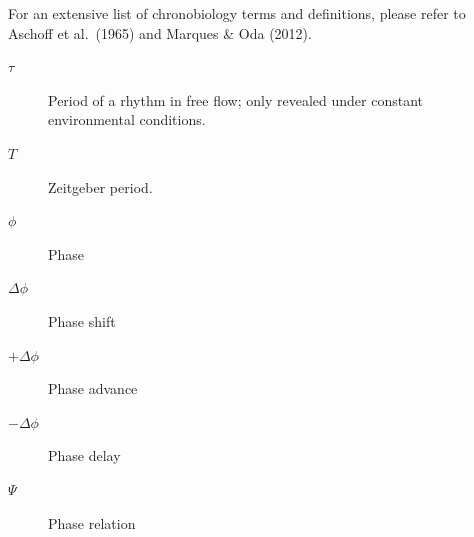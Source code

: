 \documentclass[
  12pt,
  a4paper,
  oneside]{tesesusp}
\begin{document}

\begin{simbolos}
For an extensive list of chronobiology terms and definitions, please
refer to Aschoff et al.~(1965) and Marques \& Oda (2012).

\begin{description}
\item[\(\tau\)]
\hspace{20cm}

Period of a rhythm in free flow; only revealed under constant
environmental conditions.
\item[\(T\)]
\hspace{20cm}

Zeitgeber period.
\item[\(\phi\)]
\hspace{20cm}

Phase
\item[\(\Delta\phi\)]
\hspace{20cm}

Phase shift
\item[\(+\Delta\phi\)]
\hspace{20cm}

Phase advance
\item[\(-\Delta\phi\)]
\hspace{20cm}

Phase delay
\item[\(\Psi\)]
\hspace{20cm}

Phase relation
\end{description}
\end{simbolos}

\end{document}

